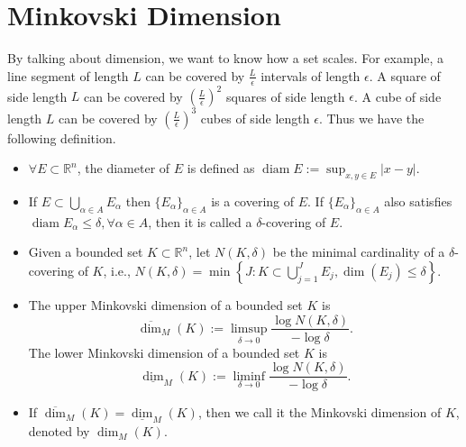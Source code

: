     \section{Minkovski Dimension}
    By talking about dimension, we want to know how a set scales. For example, a line segment of length $L$ can be covered by $\frac{L}{\epsilon}$ intervals of length $\epsilon$. A square of side length $L$ can be covered by $\left(\frac{L}{\epsilon}\right)^2$ squares of side length $\epsilon$. A cube of side length $L$ can be covered by $\left(\frac{L}{\epsilon}\right)^3$ cubes of side length $\epsilon$. Thus we have the following definition.
    \begin{definition}
        \begin{itemize}
            \item[(i)] $\forall E \subset \mathbb{R}^{n}$, the diameter of $E$ is defined as $\operatorname{diam}E:= \sup_{x,y \in E} \left\vert x-y \right\vert $.
            \item[(ii)] If $E \subset \bigcup_{\alpha \in A} E_{\alpha}$ then $\{ E_{\alpha} \}_{\alpha \in A}$ is a covering of $E$. If $\{ E_{\alpha} \}_{\alpha \in A}$ also satisfies $\operatorname{diam} E_{\alpha} \leq \delta, \forall \alpha \in A$, then it is called a $\delta$-covering of $E$.
        \end{itemize}
    \end{definition}
    \begin{definition}
        \begin{itemize}
            \item[(i)] Given a bounded set $K \subset \mathbb{R}^{n}$, let $N(K,\delta)$ be the minimal cardinality of a $\delta$-covering of $K$, i.e., $N(K,\delta)=\min \left\{ J: K \subset \bigcup_{j=1}^{J} E_{j}, \operatorname{dim}(E_{j})\le \delta\right\}$.
            \item[(ii)] The upper Minkovski dimension of a bounded set $K$ is
            \begin{equation*}
                \overline{\dim}_M(K):=\limsup_{\delta \to 0} \frac{\log N(K,\delta)}{-\log \delta}.
            \end{equation*}
            The lower Minkovski dimension of a bounded set $K$ is
            \begin{equation*}
                \underline{\dim}_M(K):=\liminf_{\delta \to 0} \frac{\log N(K,\delta)}{-\log \delta}.
            \end{equation*}
            \item[(iii)] If $\overline{\dim}_M(K)=\underline{\dim}_M(K)$, then we call it the Minkovski dimension of $K$, denoted by $\dim_M(K)$.
        \end{itemize}
    \end{definition}
